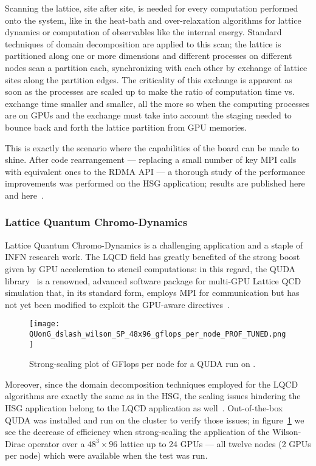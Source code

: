 Scanning the lattice, site after site, is needed for every computation
performed onto the system, like in the heat-bath and over-relaxation
algorithms for lattice dynamics or computation of observables like the
internal energy.
Standard techniques of domain decomposition are applied to this scan;
the lattice is partitioned along one or more dimensions and different
processes on different nodes scan a partition each, synchronizing with
each other by exchange of lattice sites along the partition edges.
The criticality of this exchange is apparent as soon as the processes
are scaled up to make the ratio of computation time vs. exchange time
smaller and smaller, all the more so when the computing processes are
on GPUs and the exchange must take into account the staging needed to
bounce back and forth the lattice partition from GPU memories.

This is exactly the scenario where the \PtoP capabilities of the
\apenetp board can be made to shine.
After code rearrangement --- replacing a small number of key MPI calls
with equivalent ones to the RDMA API --- a thorough study of the
performance improvements was performed on the HSG application; results
are published here~\cite{Bernaschi2013250} and here~\cite{CASS2013}.

\subsubsection{Lattice Quantum Chromo-Dynamics}
Lattice Quantum Chromo-Dynamics is a challenging application and a
staple of INFN research work.
The LQCD field has greatly benefited of the strong boost given by GPU
acceleration to stencil computations: in this regard, the QUDA
library~\cite{Clark:2009wm} is a renowned, advanced software package
for multi-GPU Lattice QCD simulation that, in its standard form,
employs MPI for communication but has not yet been modified to exploit
the GPU-aware directives~\cite{Babich:2010}.

\begin{figure}[!hbt]
  \centering
  \texttt{[image: QUonG\_dslash\_wilson\_SP\_48x96\_gflops\_per\_node\_PROF\_TUNED.png]}
  \caption{Strong-scaling plot of GFlops per node for a QUDA run on
    \quong.}
  \label{fig:qudagflops}
\end{figure}

Moreover, since the domain decomposition techniques employed for the
LQCD algorithms are exactly the same as in the HSG, the scaling issues
hindering the HSG application belong to the LQCD application as
well~\cite{Babich2:2011}.
Out-of-the-box QUDA was installed and run on the \quong cluster to
verify those issues; in figure~\ref{fig:qudagflops} we see the
decrease of efficiency when strong-scaling the application of the
Wilson-Dirac operator over a $48^{3}\times96$ lattice up to 24 GPUs
--- all twelve \quong nodes (2 GPUs per node) which were available
when the test was run.

